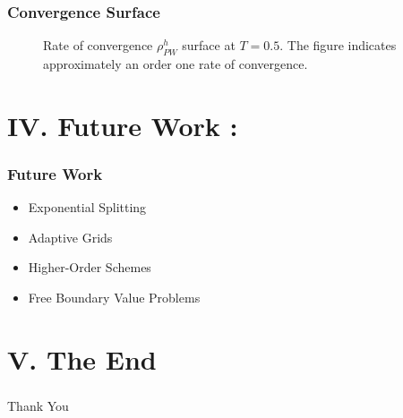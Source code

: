 \documentclass{beamer}
\newcommand{\green}{\color{BaylorGreen}}
\newcommand{\bit}{\begin{itemize}}
\newcommand{\eit}{\end{itemize}}
\begin{document}
\begin{frame}
\frametitle{Convergence Surface}
\begin{figure}
\begin{center}

{}

\caption{Rate of convergence $\rho^h_{PW}$ surface at  $T=0.5.$ The figure indicates approximately an order one rate of convergence.}\label{figure:5}
\end{center}
\end{figure}
\end{frame}

\section{IV. Future Work :}
\begin{frame}
\frametitle{Future Work}
\bit
\item Exponential Splitting 

\item Adaptive Grids

\item Higher-Order Schemes

\item Free Boundary Value Problems

\eit

\end{frame}
\section{V. The End}
\begin{frame}
\frametitle{}
\begin{center}
    {\green\huge Thank You}
\end{center}
\end{frame}
\end{document}
